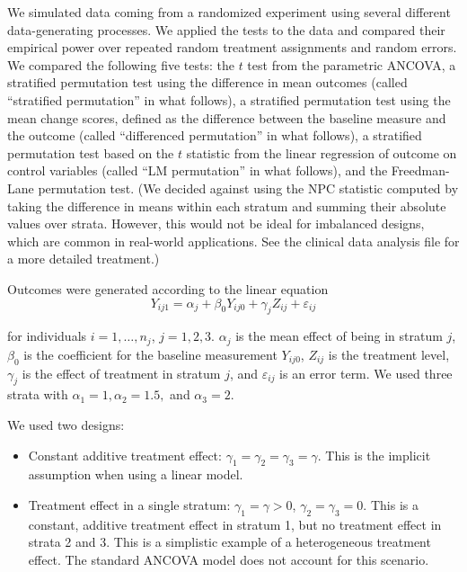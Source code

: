 \documentclass[12pt]{article}
\newcommand{\todo}[1]{{\color{red}{TO DO: \sc #1}}}
\begin{document}
We simulated data coming from a randomized experiment using several different data-generating processes.
We applied the tests to the data and compared their empirical power over repeated random treatment assignments and random errors.
We compared the following five tests:
the $t$ test from the parametric ANCOVA,
a stratified permutation test using the difference in mean outcomes
 (called ``stratified permutation'' in what follows),
a stratified permutation test using the mean change scores, defined as the difference between the baseline measure and the outcome (called ``differenced permutation'' in what follows),
a stratified permutation test based on the $t$ statistic from the linear regression of outcome on control variables (called ``LM permutation'' in what follows),
and the Freedman-Lane permutation test.
(We decided against using the NPC statistic computed by taking the difference in means within each stratum and summing their absolute values over strata. 
However, this would not be ideal for imbalanced designs, which are common in real-world applications.  
See the clinical data analysis file for a more detailed treatment.) \todo{supplementary ref}


Outcomes were generated according to the linear equation 
\begin{equation}\label{eqn:dgp}
Y_{ij1} =\alpha_j + \beta_0Y_{ij0} + \gamma_j Z_{ij} + \varepsilon_{ij}
\end{equation}

\noindent for individuals $i = 1, \dots, n_j$, $j = 1, 2, 3$.
$\alpha_j$ is the mean effect of being in stratum $j$, 
$\beta_0$ is the coefficient for the baseline measurement $Y_{ij0}$, 
$Z_{ij}$ is the treatment level, 
$\gamma_j$ is the effect of treatment in stratum $j$, 
and $\varepsilon_{ij}$ is an error term.
We used three strata with $\alpha_1 = 1, \alpha_2 = 1.5,$ and $\alpha_3 = 2$.

We used two designs:
\begin{itemize}
\item Constant additive treatment effect: $\gamma_1 = \gamma_2 = \gamma_3 = \gamma$. This is the implicit assumption when using a linear model.
\item Treatment effect in a single stratum: $\gamma_1 = \gamma > 0$, $\gamma_2 = \gamma_3 = 0$. This is a constant, additive treatment effect in stratum 1, but no treatment effect in strata 2 and 3. This is a simplistic example of a heterogeneous treatment effect. The standard ANCOVA model does not account for this scenario.
\end{itemize}
\end{document}

